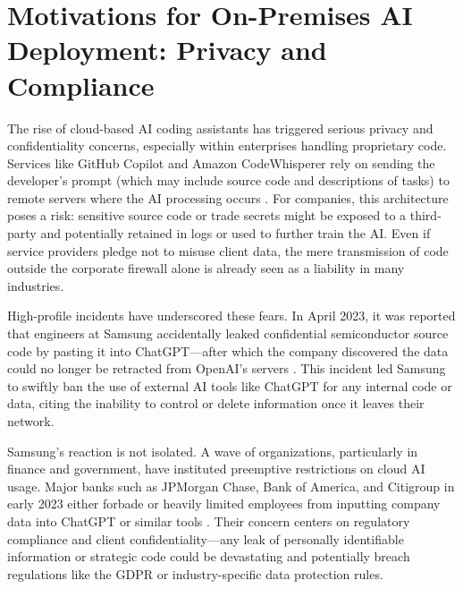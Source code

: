 \section{Motivations for On-Premises AI Deployment: Privacy and Compliance}
\label{sec:on-prem-motivations}
The rise of cloud-based \gls{AI} coding assistants has triggered serious privacy and confidentiality concerns, especially within enterprises handling proprietary code. Services like GitHub Copilot and Amazon CodeWhisperer rely on sending the developer’s prompt (which may include source code and descriptions of tasks) to remote servers where the \gls{AI} processing occurs \autocite{GithubCopilotArchitecture,AWSCodeWhispererPromptEngineering}. For companies, this architecture poses a risk: sensitive source code or trade secrets might be exposed to a third-party and potentially retained in logs or used to further train the \gls{AI}. Even if service providers pledge not to misuse client data, the mere transmission of code outside the corporate firewall alone is already seen as a liability in many industries.

High-profile incidents have underscored these fears. In April 2023, it was reported that engineers at Samsung accidentally leaked confidential semiconductor source code by pasting it into ChatGPT—after which the company discovered the data could no longer be retracted from OpenAI’s servers \autocite{Park2023Samsung}. This incident led Samsung to swiftly ban the use of external \gls{AI} tools like ChatGPT for any internal code or data, citing the inability to control or delete information once it leaves their network.

Samsung’s reaction is not isolated. A wave of organizations, particularly in finance and government, have instituted preemptive restrictions on cloud \gls{AI} usage. Major banks such as JPMorgan Chase, Bank of America, and Citigroup in early 2023 either forbade or heavily limited employees from inputting company data into ChatGPT or similar tools \autocite{Kessel2024}. Their concern centers on regulatory compliance and client confidentiality—any leak of personally identifiable information or strategic code could be devastating and potentially breach regulations like the GDPR or industry-specific data protection rules.

